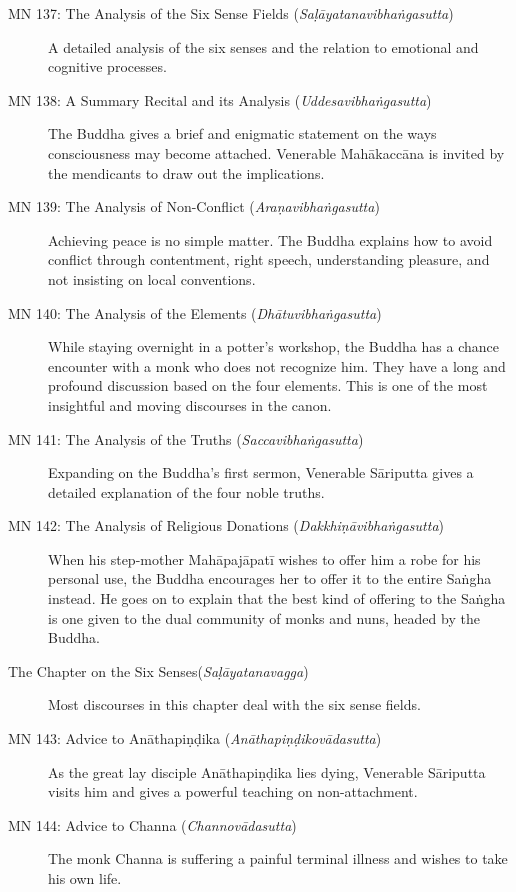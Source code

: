 \documentclass[12pt,openany]{book}%
\begin{document}
\begin{description}
\item[MN 137: The Analysis of the Six Sense Fields (\textit{\textsanskrit{Saḷāyatanavibhaṅgasutta}})] A detailed analysis of the six senses and the relation to emotional and cognitive processes.%
\item[MN 138: A Summary Recital and its Analysis (\textit{\textsanskrit{Uddesavibhaṅgasutta}})] The Buddha gives a brief and enigmatic statement on the ways consciousness may become attached. Venerable \textsanskrit{Mahākaccāna} is invited by the mendicants to draw out the implications.%
\item[MN 139: The Analysis of Non-Conflict (\textit{\textsanskrit{Araṇavibhaṅgasutta}})] Achieving peace is no simple matter. The Buddha explains how to avoid conflict through contentment, right speech, understanding pleasure, and not insisting on local conventions.%
\item[MN 140: The Analysis of the Elements (\textit{\textsanskrit{Dhātuvibhaṅgasutta}})] While staying overnight in a potter’s workshop, the Buddha has a chance encounter with a monk who does not recognize him. They have a long and profound discussion based on the four elements. This is one of the most insightful and moving discourses in the canon.%
\item[MN 141: The Analysis of the Truths (\textit{\textsanskrit{Saccavibhaṅgasutta}})] Expanding on the Buddha’s first sermon, Venerable \textsanskrit{Sāriputta} gives a detailed explanation of the four noble truths.%
\item[MN 142: The Analysis of Religious Donations (\textit{\textsanskrit{Dakkhiṇāvibhaṅgasutta}})] When his step-mother \textsanskrit{Mahāpajāpatī} wishes to offer him a robe for his personal use, the Buddha encourages her to offer it to the entire \textsanskrit{Saṅgha} instead. He goes on to explain that the best kind of offering to the \textsanskrit{Saṅgha} is one given to the dual community of monks and nuns, headed by the Buddha.%
\item[The Chapter on the Six Senses(\textit{\textsanskrit{Saḷāyatanavagga}})] Most discourses in this chapter deal with the six sense fields.%
\item[MN 143: Advice to \textsanskrit{Anāthapiṇḍika} (\textit{\textsanskrit{Anāthapiṇḍikovādasutta}})] As the great lay disciple \textsanskrit{Anāthapiṇḍika} lies dying, Venerable \textsanskrit{Sāriputta} visits him and gives a powerful teaching on non-attachment.%
\item[MN 144: Advice to Channa (\textit{\textsanskrit{Channovādasutta}})] The monk Channa is suffering a painful terminal illness and wishes to take his own life.%

\end{description}
\end{document}
